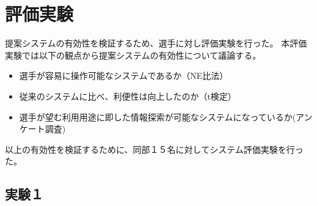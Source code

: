 \documentclass[sotsuron]{kuee}
\begin{document}
\chapter{評価実験}
提案システムの有効性を検証するため、選手に対し評価実験を行った。
本評価実験では以下の観点から提案システムの有効性について議論する。
\begin{itemize}
	\item 選手が容易に操作可能なシステムであるか（NE比法）
	\item 従来のシステムに比べ、利便性は向上したのか（t検定）
	\item 選手が望む利用用途に即した情報探索が可能なシステムになっているか(アンケート調査)
\end{itemize}
以上の有効性を検証するために、同部１５名に対してシステム評価実験を行った。
\section{実験１}
\end{document}
